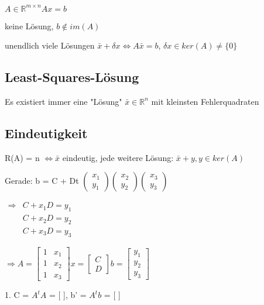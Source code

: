 \documentclass[12pt,a4paper]{article} %
\begin{document}
	$A \in \mathbb{R}^{m \times n} Ax = b$
	
	keine Lösung, $b \notin im(A)$
	
	unendlich viele Lösungen $\bar{x} + \delta x \Leftrightarrow A\bar{x}= b$, $\delta x \in ker(A) \ne \{0\}$
	
	\subsection{Least-Squares-Lösung}
	
	Es existiert immer eine "Lösung" $\bar{x} \in \mathbb{R}^n$ mit kleinsten Fehlerquadraten
	
	\subsection{Eindeutigkeit}
	
	R(A) = n $\Leftrightarrow \bar{x}$ eindeutig, jede weitere Lösung: $\bar{x} + y, y \in ker(A)$
	
	Gerade: b = C + Dt 
	$\begin{pmatrix}
		x_1 \\
		y_1
	\end{pmatrix}
	\begin{pmatrix}
	x_2 \\
	y_2
	\end{pmatrix}
	\begin{pmatrix}
	x_3 \\
	y_3
	\end{pmatrix}$
	
	$\begin{matrix}
		\Rightarrow & C + x_1D = y_1 \\
		& C + x_2D = y_2 \\
		& C + x_3D = y_3 
	\end{matrix}$
	
	$\Rightarrow A = \begin{bmatrix}
		1 & x_1 \\
		1 & x_2 \\
		1 & x_3 
	\end{bmatrix}
	x = 
	\begin{bmatrix}
		C \\
		D
	\end{bmatrix}
	b = 
	\begin{bmatrix}
		y_1 \\
		y_2 \\
		y_3
	\end{bmatrix}$
	
	1. C = $A^tA$ = [ ], b' = $A^tb$ = [ ]
	
\end{document}
